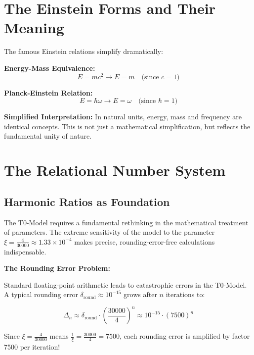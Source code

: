 \documentclass[12pt,a4paper]{report}
\newcommand{\xipar}{\xi}      %
\begin{document}
\section{The Einstein Forms and Their Meaning}\label{sec:einstein_forms}

The famous Einstein relations simplify dramatically:

\textbf{Energy-Mass Equivalence:}
\begin{equation}
	E = mc^2 \rightarrow E = m \quad \text{(since $c = 1$)}
\end{equation}

\textbf{Planck-Einstein Relation:}
\begin{equation}
	E = \hbar\omega \rightarrow E = \omega \quad \text{(since $\hbar = 1$)}
\end{equation}

\textbf{Simplified Interpretation:}
In natural units, energy, mass and frequency are identical concepts. This is not just a mathematical simplification, but reflects the fundamental unity of nature.

\section{The Relational Number System}\label{sec:relational_number_system}

\subsection{Harmonic Ratios as Foundation}\label{subsec:harmonic_ratios}

The T0-Model requires a fundamental rethinking in the mathematical treatment of parameters. The extreme sensitivity of the model to the parameter $\xipar = \frac{4}{30000} \approx 1.33 \times 10^{-4}$ makes precise, rounding-error-free calculations indispensable.

\textbf{The Rounding Error Problem:}

Standard floating-point arithmetic leads to catastrophic errors in the T0-Model. A typical rounding error $\delta_{\text{round}} \approx 10^{-15}$ grows after $n$ iterations to:

\begin{equation}
	\Delta_n \approx \delta_{\text{round}} \cdot \left(\frac{30000}{4}\right)^n \approx 10^{-15} \cdot (7500)^n
\end{equation}

Since $\xipar = \frac{4}{30000}$ means $\frac{1}{\xipar} = \frac{30000}{4} = 7500$, each rounding error is amplified by factor 7500 per iteration!
\end{document}
